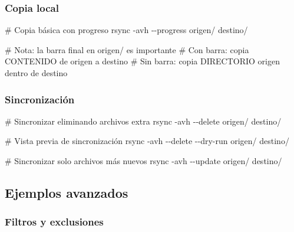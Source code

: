 \documentclass[
  11pt,
  letterpaper,
  oneside,
  openany]{scrbook}
\newenvironment{Shaded}{}{}
\newcommand{\AttributeTok}[1]{\textcolor[rgb]{0.84,0.23,0.29}{#1}}
\newcommand{\CommentTok}[1]{\textcolor[rgb]{0.42,0.45,0.49}{#1}}
\newcommand{\FunctionTok}[1]{\textcolor[rgb]{0.44,0.26,0.76}{#1}}
\newcommand{\NormalTok}[1]{\textcolor[rgb]{0.14,0.16,0.18}{#1}}
\begin{document}
\subsubsection{Copia local}\label{copia-local}

\begin{Shaded}
\begin{Highlighting}[]
\CommentTok{\# Copia básica con progreso}
\FunctionTok{rsync} \AttributeTok{{-}avh} \AttributeTok{{-}{-}progress}\NormalTok{ origen/ destino/}

\CommentTok{\# Nota: la barra final en origen/ es importante}
\CommentTok{\# Con barra: copia CONTENIDO de origen a destino}
\CommentTok{\# Sin barra: copia DIRECTORIO origen dentro de destino}
\end{Highlighting}
\end{Shaded}

\subsubsection{Sincronización}\label{sincronizaciuxf3n}

\begin{Shaded}
\begin{Highlighting}[]
\CommentTok{\# Sincronizar eliminando archivos extra}
\FunctionTok{rsync} \AttributeTok{{-}avh} \AttributeTok{{-}{-}delete}\NormalTok{ origen/ destino/}

\CommentTok{\# Vista previa de sincronización}
\FunctionTok{rsync} \AttributeTok{{-}avh} \AttributeTok{{-}{-}delete} \AttributeTok{{-}{-}dry{-}run}\NormalTok{ origen/ destino/}

\CommentTok{\# Sincronizar solo archivos más nuevos}
\FunctionTok{rsync} \AttributeTok{{-}avh} \AttributeTok{{-}{-}update}\NormalTok{ origen/ destino/}
\end{Highlighting}
\end{Shaded}

\subsection{Ejemplos avanzados}\label{ejemplos-avanzados-1}

\subsubsection{Filtros y exclusiones}\label{filtros-y-exclusiones}
\end{document}
